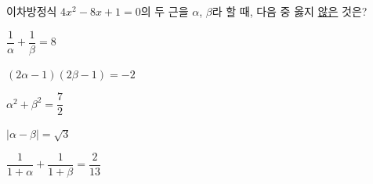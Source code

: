 이차방정식 $4x^2-8x+1=0$의 두 근을 $\alpha$, $\beta$라 할 때, 다음 중 옳지 \underline{않은} 것은?
\begin{choicesii}{\rule[-3ex]{0pt}{8ex}$\dfrac{1}{\alpha}+\dfrac{1}{\beta}=8$}{\rule[-3ex]{0pt}{8ex}$(2\alpha-1)(2\beta-1)=-2$}{\rule[-3ex]{0pt}{8ex}$\alpha^2+\beta^2=\dfrac{7}{2}$}{\rule[-3ex]{0pt}{8ex}$|\alpha-\beta|=\sqrt{3}$}{\rule[-3ex]{0pt}{8ex}$\dfrac{1}{1+\alpha}+\dfrac{1}{1+\beta}=\dfrac{2}{13}$}\end{choicesii}
